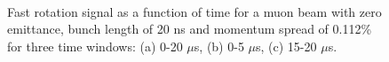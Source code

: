 \begin{figure}[bt]
\centering
{}\\
\caption{Fast rotation signal as a function of time for a muon beam with zero emittance, bunch length of 20 ns and momentum spread of 0.112\% for three time windows: (a) 0-20 $\mu$s, (b) 0-5 $\mu$s, (c) 15-20 $\mu$s.}
\label{fig:E_T_spread_frs}
\end{figure}

